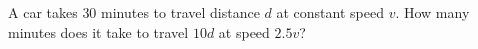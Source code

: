 A car takes $30$ minutes to travel distance $d$ at constant speed $v$. How many minutes does it take to travel $10d$ at speed $2.5v$?
